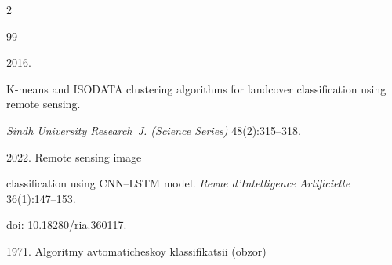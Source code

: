 














\vspace*{-8pt}





  \begin{multicols}{2}





\renewcommand{\bibname}{\protect\rmfamily References}







{\small\frenchspacing


 {%




 \begin{thebibliography}{99} 


 


 \vspace*{-2pt}


 


 




 2016.  


K-means and ISODATA clustering algorithms for landcover classification using remote sensing. 


\textit{Sindh University Research~J. (Science Series)} 48(2):315--318.




 2022. Remote sensing image 


classification using CNN--LSTM model. \textit{Revue d'Intelligence Artificielle} 36(1):147--153. 


doi: 10.18280/ria.360117.




 1971. Algoritmy avtomaticheskoy klassifikatsii (obzor)



\end{thebibliography}}}
\end{multicols}
